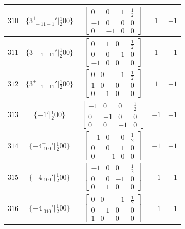 \documentclass[fleqn,8pt]{jsarticle}
\begin{document}
\begin{longtable}{ccccc}
$ 310 $ & $ \{3^{+}_{\,\,-11-1}{}'|\frac{1}{2} 0 0\} $ & $ \begin{bmatrix} 0 & 0 & 1 & \frac{1}{2} \\ -1 & 0 & 0 & 0 \\ 0 & -1 & 0 & 0 \end{bmatrix} $ & $ 1 $ & $ -1 $ \\ \hline
$ 311 $ & $ \{3^{-}_{\,\,-1-11}{}'|\frac{1}{2} 0 0\} $ & $ \begin{bmatrix} 0 & 1 & 0 & \frac{1}{2} \\ 0 & 0 & -1 & 0 \\ -1 & 0 & 0 & 0 \end{bmatrix} $ & $ 1 $ & $ -1 $ \\ \hline
$ 312 $ & $ \{3^{+}_{\,\,-1-11}{}'|\frac{1}{2} 0 0\} $ & $ \begin{bmatrix} 0 & 0 & -1 & \frac{1}{2} \\ 1 & 0 & 0 & 0 \\ 0 & -1 & 0 & 0 \end{bmatrix} $ & $ 1 $ & $ -1 $ \\ \hline
$ 313 $ & $ \{-1{}'|\frac{1}{2} 0 0\} $ & $ \begin{bmatrix} -1 & 0 & 0 & \frac{1}{2} \\ 0 & -1 & 0 & 0 \\ 0 & 0 & -1 & 0 \end{bmatrix} $ & $ -1 $ & $ -1 $ \\ \hline
$ 314 $ & $ \{-4^{+}_{\,\,100}{}'|\frac{1}{2} 0 0\} $ & $ \begin{bmatrix} -1 & 0 & 0 & \frac{1}{2} \\ 0 & 0 & 1 & 0 \\ 0 & -1 & 0 & 0 \end{bmatrix} $ & $ -1 $ & $ -1 $ \\ \hline
$ 315 $ & $ \{-4^{-}_{\,\,100}{}'|\frac{1}{2} 0 0\} $ & $ \begin{bmatrix} -1 & 0 & 0 & \frac{1}{2} \\ 0 & 0 & -1 & 0 \\ 0 & 1 & 0 & 0 \end{bmatrix} $ & $ -1 $ & $ -1 $ \\ \hline
$ 316 $ & $ \{-4^{+}_{\,\,010}{}'|\frac{1}{2} 0 0\} $ & $ \begin{bmatrix} 0 & 0 & -1 & \frac{1}{2} \\ 0 & -1 & 0 & 0 \\ 1 & 0 & 0 & 0 \end{bmatrix} $ & $ -1 $ & $ -1 $ \\ \hline

\end{longtable}
\end{document}
